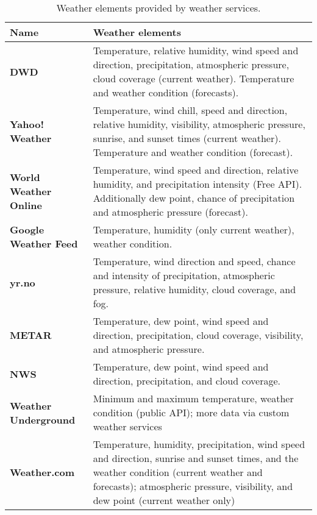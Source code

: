 \begin{table}
\centering
\begin{tabular}{|p{}|p{}|}
  \hline
  \textbf{Name} & \textbf{Weather elements} \\
  \hline\hline
  \textbf{DWD} & Temperature, relative humidity, wind speed and direction, precipitation, atmospheric pressure, cloud coverage (current weather). Temperature and weather condition (forecasts).\\
  \hline
  \textbf{Yahoo! Weather} & Temperature, wind chill, speed and direction, relative humidity, visibility, atmospheric pressure, sunrise, and sunset times (current weather). Temperature and weather condition (forecast).\\
  \hline
  \textbf{World Weather Online} & Temperature, wind speed and direction, relative humidity, and precipitation intensity (Free API). Additionally dew point, chance of precipitation and atmospheric pressure (forecast).\\
  \hline
  \textbf{Google Weather Feed} & Temperature, humidity (only current weather), weather condition.\\
  \hline
  \textbf{yr.no} & Temperature, wind direction and speed, chance and intensity of precipitation, atmospheric pressure, relative humidity, cloud coverage, and fog.\\
  \hline
  \textbf{\acs{METAR}} & Temperature, dew point, wind speed and direction, precipitation, cloud coverage, visibility, and atmospheric pressure. \\
  \hline
  \textbf{\acs{NWS}} & Temperature, dew point, wind speed and direction, precipitation, and cloud coverage. \\
  \hline
  \textbf{Weather Underground} & Minimum and maximum temperature, weather condition (public API); more data via custom weather services \\
  \hline
  \textbf{Weather.com} & Temperature, humidity, precipitation, wind speed and direction, sunrise and sunset times, and the weather condition (current weather and forecasts); atmospheric pressure, visibility, and dew point (current weather only) \\
  \hline
\end{tabular}
\caption{Weather elements provided by weather services.}
\label{table:weather_data6}
\end{table}

